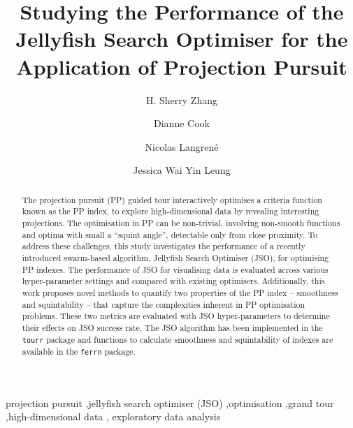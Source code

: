 \documentclass[
  number,
  preprint,
  3p]{elsarticle}
\begin{document}
\begin{frontmatter}
\title{Studying the Performance of the Jellyfish Search Optimiser for
the Application of Projection Pursuit}
\author[1]{H. Sherry Zhang%
%
}
\author[2]{Dianne Cook%
%
}
\author[3]{Nicolas Langrené%
%
}
\author[2]{Jessica Wai Yin Leung%
%
}






        
\begin{abstract}
The projection pursuit (PP) guided tour interactively optimises a
criteria function known as the PP index, to explore high-dimensional
data by revealing interesting projections. The optimisation in PP can be
non-trivial, involving non-smooth functions and optima with small a
``squint angle'', detectable only from close proximity. To address these
challenges, this study investigates the performance of a recently
introduced swarm-based algorithm, Jellyfish Search Optimiser (JSO), for
optimising PP indexes. The performance of JSO for visualising data is
evaluated across various hyper-parameter settings and compared with
existing optimisers. Additionally, this work proposes novel methods to
quantify two properties of the PP index -- smoothness and squintability
-- that capture the complexities inherent in PP optimisation problems.
These two metrics are evaluated with JSO hyper-parameters to determine
their effects on JSO success rate. The JSO algorithm has been
implemented in the \texttt{tourr} package and functions to calculate
smoothness and squintability of indexes are available in the
\texttt{ferrn} package.
\end{abstract}





\begin{keyword}
    projection pursuit \sep jellyfish search optimiser
(JSO) \sep optimisation \sep grand tour \sep high-dimensional data \sep 
    exploratory data analysis
\end{keyword}
\end{frontmatter}
    
\end{document}
